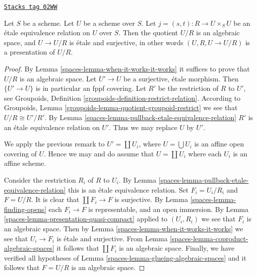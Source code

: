 \begin{theorem}[Presentation]
\label{spaces-theorem-presentation}
\href{https://stacks.math.columbia.edu/tag/02WW}{\texttt{Stacks tag 02WW}}

Let $S$ be a scheme. Let $U$ be a scheme over $S$.
Let $j = (s, t) : R \to U \times_S U$
be an \'etale equivalence relation on $U$ over $S$.
Then the quotient $U/R$ is an algebraic space,
and $U \to U/R$ is \'etale and surjective, in other words
$(U, R, U \to U/R)$ is a presentation of $U/R$.
\end{theorem}

\begin{proof}

By Lemma \ref{spaces-lemma-when-it-works-it-works}
it suffices to prove that $U/R$ is an algebraic space.
Let $U' \to U$ be a surjective, \'etale morphism.
Then $\{U' \to U\}$ is in particular an fppf covering.
Let $R'$ be the restriction of $R$ to $U'$, see
Groupoids, Definition \ref{groupoids-definition-restrict-relation}.
According to
Groupoids, Lemma \ref{groupoids-lemma-quotient-groupoid-restrict}
we see that $U/R \cong U'/R'$.
By Lemma \ref{spaces-lemma-pullback-etale-equivalence-relation} $R'$ is an
\'etale equivalence relation on $U'$. Thus we may replace $U$ by $U'$.

\medskip\noindent
We apply the previous remark to $U' = \coprod U_i$, where
$U = \bigcup U_i$ is an affine open covering of $U$. Hence we
may and do assume that $U = \coprod U_i$ where
each $U_i$ is an affine scheme.

\medskip\noindent
Consider the restriction $R_i$ of $R$ to $U_i$.
By Lemma \ref{spaces-lemma-pullback-etale-equivalence-relation}
this is an \'etale equivalence relation.
Set $F_i = U_i/R_i$ and $F = U/R$.
It is clear that $\coprod F_i \to F$ is surjective.
By Lemma \ref{spaces-lemma-finding-opens} each $F_i \to F$
is representable, and an open immersion.
By Lemma \ref{spaces-lemma-presentation-quasi-compact}
applied to $(U_i, R_i)$ we see that $F_i$ is an algebraic space.
Then by Lemma \ref{spaces-lemma-when-it-works-it-works} we see that
$U_i \to F_i$ is \'etale and surjective.
From Lemma \ref{spaces-lemma-coproduct-algebraic-spaces}
it follows that $\coprod F_i$ is an algebraic space.
Finally, we have verified all
hypotheses of Lemma \ref{spaces-lemma-glueing-algebraic-spaces}
and it follows that $F = U/R$ is an algebraic space.
\end{proof}

